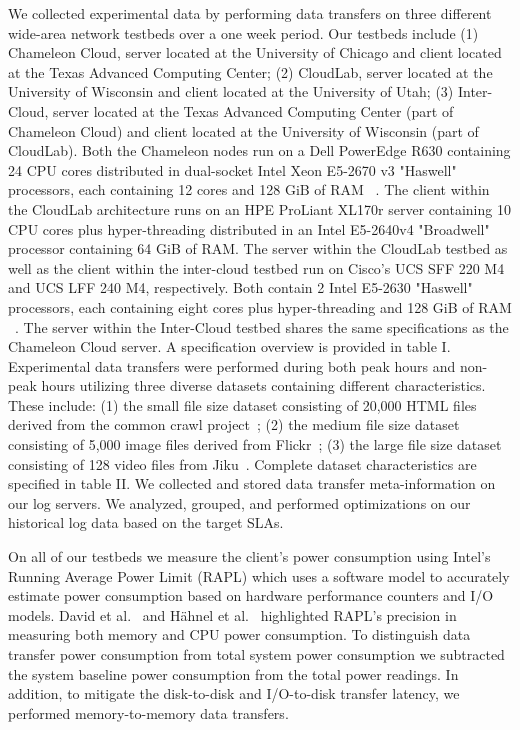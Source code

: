 \documentclass[conference]{IEEEtran}
\begin{document}
We collected experimental data by performing data transfers on three different wide-area network testbeds over a one week period.  %
Our testbeds include (1) Chameleon Cloud, server located at the University of Chicago and client located at the Texas Advanced Computing Center; (2) CloudLab, server located at the University of Wisconsin and client located at the University of Utah; (3) Inter-Cloud, server located at the Texas Advanced Computing Center (part of Chameleon Cloud) and client located at the University of Wisconsin (part of CloudLab). Both the Chameleon nodes run on a Dell PowerEdge R630 containing 24 CPU cores distributed in dual-socket Intel Xeon E5-2670 v3 "Haswell" processors, each containing 12 cores and 128 GiB of RAM ~\cite{keahey2020lessons}. The client within the CloudLab architecture runs on an HPE ProLiant XL170r server containing 10 CPU cores plus hyper-threading distributed in an Intel E5-2640v4 "Broadwell" processor containing 64 GiB of RAM. The server within the CloudLab testbed as well as the client within the inter-cloud testbed run on Cisco's UCS SFF 220 M4 and UCS LFF 240 M4, respectively. Both contain 2 Intel E5-2630 "Haswell" processors, each containing eight cores plus hyper-threading and 128 GiB of RAM ~\cite{Duplyakin+:ATC19}.  The server within the Inter-Cloud testbed shares the same specifications as the Chameleon Cloud server. A specification overview is provided in table I. Experimental data transfers were performed during both peak hours and non-peak hours utilizing three diverse datasets containing different characteristics. These include: (1) the small file size dataset consisting of 20,000 HTML files derived from the common crawl project~\cite{CommonCrawl2020}; (2) the medium file size dataset consisting of 5,000 image files derived from Flickr~\cite{YahooFlickr}; (3) the large file size dataset consisting of 128 video files from Jiku~\cite{JikuVideoDataSet2020}. Complete dataset characteristics are specified in table II. We collected and stored data transfer meta-information on our log servers. We analyzed, grouped, and performed optimizations on our historical log data based on the target SLAs.  \par On all of our testbeds we measure the client's power consumption using Intel's Running Average Power Limit (RAPL) which uses a software model to accurately estimate power consumption based on hardware performance counters and I/O models. David et al.~\cite{5599016} and H\"ahnel et al.~\cite{hahnel2012measuring} highlighted RAPL's precision in measuring both memory and CPU power consumption. To distinguish data transfer power consumption from total system power consumption we subtracted the system baseline power consumption from the total power readings. In addition, to mitigate the disk-to-disk and I/O-to-disk transfer latency, we performed memory-to-memory data transfers. \par
\end{document}
